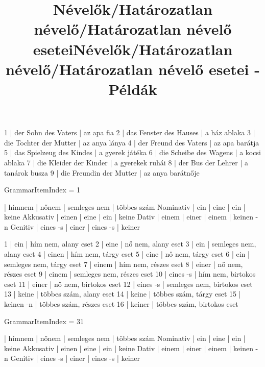 \begin{exmp}
1 | der Sohn des Vaters | az apa fia
2 | das Fenster des Hauses | a ház ablaka
3 | die Tochter der Mutter | az anya lánya
4 | der Freund des Vaters | az apa barátja
5 | das Spielzeug des Kindes | a gyerek játéka
6 | die Scheibe des Wagens | a kocsi ablaka
7 | die Kleider der Kinder | a gyerekek ruhái
8 | der Bus der Lehrer | a tanárok busza
9 | die Freundin der Mutter | az anya barátnője
\end{exmp}

\title{Névelők/Határozatlan névelő/Határozatlan névelő esetei}

GrammarItemIndex = 1

\begin{desc}
          | hímnem   | nőnem | semleges nem | többes szám
Nominativ | ein      | eine  | ein          | keine
Akkusativ | einen    | eine  | ein          | keine
Dativ     | einem    | einer | einem        | keinen -n
Genitiv   | eines -s | einer | eines -s     | keiner
\end{desc}

\begin{exmp}
1 | ein | hím nem, alany eset
2 | eine | nő nem, alany eset
3 | ein | semleges nem, alany eset
4 | einen | hím nem, tárgy eset
5 | eine | nő nem, tárgy eset
6 | ein | semleges nem, tárgy eset
7 | einem | hím nem, részes eset
8 | einer | nő nem, részes eset
9 | einem | semleges nem, részes eset
10 | eines -s | hím nem, birtokos eset
11 | einer | nő nem, birtokos eset
12 | eines -s | semleges nem, birtokos eset
13 | keine | többes szám, alany eset
14 | keine | többes szám, tárgy eset
15 | keinen -n | többes szám, részes eset
16 | keiner | többes szám, birtokos eset
\end{exmp}

\title{Névelők/Határozatlan névelő/Határozatlan névelő esetei - Példák}

GrammarItemIndex = 31

\begin{desc}
          | hímnem   | nőnem | semleges nem | többes szám
Nominativ | ein      | eine  | ein          | keine
Akkusativ | einen    | eine  | ein          | keine
Dativ     | einem    | einer | einem        | keinen -n
Genitiv   | eines -s | einer | eines -s     | keiner
\end{desc}


